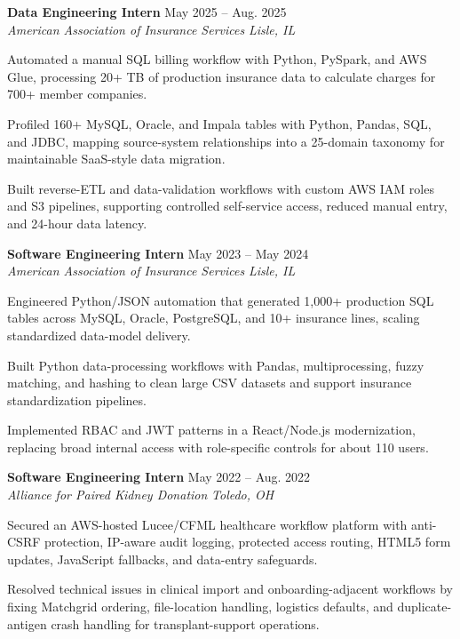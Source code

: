 \documentclass[letterpaper,11pt]{article}
\newcommand{\resumeSubheading}[4]{
  \textbf{#1} \hfill #2\\
  \textit{#3} \hfill \textit{#4}
}
\begin{document}
\resumeSubheading
{Data Engineering Intern}{May 2025 -- Aug. 2025}
{American Association of Insurance Services}{Lisle, IL}
\begin{tightitemize}
  \item Automated a manual SQL billing workflow with Python, PySpark, and AWS Glue, processing 20+ TB of production insurance data to calculate charges for 700+ member companies.
  \item Profiled 160+ MySQL, Oracle, and Impala tables with Python, Pandas, SQL, and JDBC, mapping source-system relationships into a 25-domain taxonomy for maintainable SaaS-style data migration.
  \item Built reverse-ETL and data-validation workflows with custom AWS IAM roles and S3 pipelines, supporting controlled self-service access, reduced manual entry, and 24-hour data latency.
\end{tightitemize}

\resumeSubheading
{Software Engineering Intern}{May 2023 -- May 2024}
{American Association of Insurance Services}{Lisle, IL}
\begin{tightitemize}
  \item Engineered Python/JSON automation that generated 1,000+ production SQL tables across MySQL, Oracle, PostgreSQL, and 10+ insurance lines, scaling standardized data-model delivery.
  \item Built Python data-processing workflows with Pandas, multiprocessing, fuzzy matching, and hashing to clean large CSV datasets and support insurance standardization pipelines.
  \item Implemented RBAC and JWT patterns in a React/Node.js modernization, replacing broad internal access with role-specific controls for about 110 users.
\end{tightitemize}

\resumeSubheading
{Software Engineering Intern}{May 2022 -- Aug. 2022}
{Alliance for Paired Kidney Donation}{Toledo, OH}
\begin{tightitemize}
  \item Secured an AWS-hosted Lucee/CFML healthcare workflow platform with anti-CSRF protection, IP-aware audit logging, protected access routing, HTML5 form updates, JavaScript fallbacks, and data-entry safeguards.
  \item Resolved technical issues in clinical import and onboarding-adjacent workflows by fixing Matchgrid ordering, file-location handling, logistics defaults, and duplicate-antigen crash handling for transplant-support operations.
\end{tightitemize}
\end{document}
